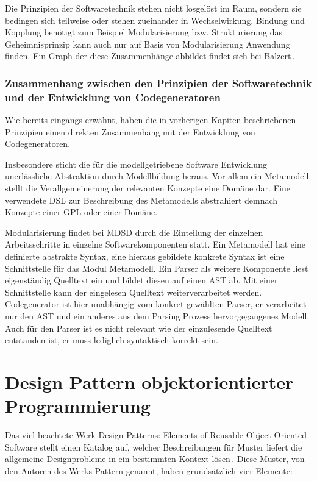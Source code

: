 \documentclass[12pt,oneside,a4paper,parskip]{scrbook}
\begin{document}
Die Prinzipien der Softwaretechnik stehen nicht losgelöst im Raum, sondern sie bedingen sich teilweise oder stehen zueinander in Wechselwirkung. Bindung und Kopplung benötigt zum Beispiel Modularisierung bzw. Strukturierung das Geheimnisprinzip kann auch nur auf Basis von Modularisierung Anwendung finden. Ein Graph der diese Zusammenhänge abbildet findet sich bei Balzert\,\cite[S. 49]{balzert2009a}.

\subsubsection{Zusammenhang zwischen den Prinzipien der Softwaretechnik und der Entwicklung von Codegeneratoren}

Wie bereits eingangs erwähnt, haben die in vorherigen Kapiten beschriebenen Prinzipien einen direkten Zusammenhang mit der Entwicklung von Codegeneratoren.

Insbesondere sticht die für die modellgetriebene Software Entwicklung unerlässliche Abstraktion durch Modellbildung heraus. Vor allem ein Metamodell stellt die Verallgemeinerung der relevanten Konzepte eine Domäne dar. Eine verwendete DSL zur Beschreibung des Metamodells abstrahiert demnach Konzepte einer GPL oder einer Domäne.

Modularisierung findet bei MDSD durch die Einteilung der einzelnen Arbeitsschritte in einzelne Softwarekomponenten statt. Ein Metamodell hat eine definierte abstrakte Syntax, eine hieraus gebildete konkrete Syntax ist eine Schnittstelle für das Modul Metamodell. Ein Parser als weitere Komponente liest eigenständig Quelltext ein und bildet diesen auf einen AST ab. Mit einer Schnittstelle kann der eingelesen Quelltext weiterverarbeitet werden. Codegenerator ist hier unabhängig vom konkret gewählten Parser, er verarbeitet nur den AST und ein anderes aus dem Parsing Prozess hervorgegangenes Modell. Auch für den Parser ist es nicht relevant wie der einzulesende Quelltext entstanden ist, er muss lediglich syntaktisch korrekt sein.

\section{Design Pattern objektorientierter Programmierung}

Das viel beachtete Werk Design Patterns: Elements of Reusable Object-Oriented Software stellt einen Katalog auf, welcher Beschreibungen für Muster liefert die allgemeine Designprobleme in ein bestimmten Kontext lösen\,\cite{gamma1995}. Diese Muster, von den Autoren des Werks Pattern genannt, haben grundsätzlich vier Elemente: 
\end{document}
